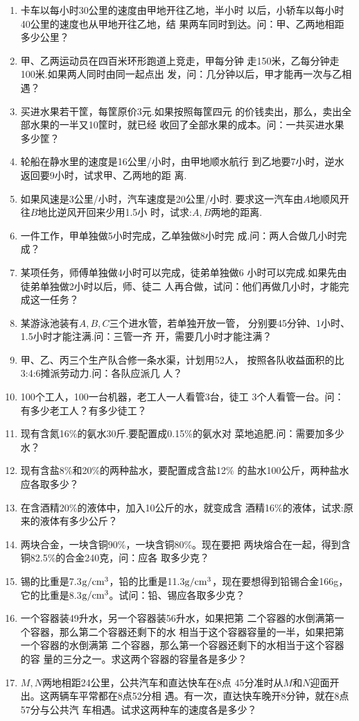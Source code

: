 \begin{enumerate}
\item  卡车以每小时30公里的速度由甲地开往乙地，半小时
以后，小轿车以每小时40公里的速度也从甲地开往乙地，结
果两车同时到达。问：甲、乙两地相距多少公里？
\item  甲、乙两运动员在四百米环形跑道上竞走，甲每分钟
走150米，乙每分钟走100米.如果两人同时由同一起点出
发，问：几分钟以后，甲才能再一次与乙相遇？
\item  买进水果若干筐，每筐原价3元.如果按照每筐四元
的价钱卖出，那么，卖出全部水果的一半又10筐时，就已经
收回了全部水果的成本。问：一共买进水果多少筐？
\item  轮船在静水里的速度是16公里/小时，由甲地顺水航行
到乙地要7小时，逆水返回要9小时，试求甲、乙两地的距
离.
\item  如果风速是3公里/小时，汽车速度是20公里/小时.
要求这一汽车由$A$地顺风开往$B$地比逆风开回来少用1.5小
时，试求:$A,B$两地的距离.
\item  一件工作，甲单独做5小时完成，乙单独做8小时完
成.问：两人合做几小时完成？
\item  某项任务，师傅单独做4小时可以完成，徒弟单独做6
小时可以完成.如果先由徒弟单独做2小时以后，师、徒二
人再合做，试问：他们再做几小时，才能完成这一任务？
\item  某游泳池装有$A, B, C$三个进水管，若单独开放一管，
分别要45分钟、1小时、1.5小时才能注满.问：三管一齐
开，需要几小时才能注满？
\item  甲、乙、丙三个生产队合修一条水渠，计划用52人，
按照各队收益面积的比3:4:6摊派劳动力.问：各队应派几
人？
\item  100个工人，100一台机器，老工人一人看管3台，徒工
3个人看管一台。问：有多少老工人？有多少徒工？
\item  现有含氮16\%的氨水30斤.要配置成0.15\%的氨水对
菜地追肥.问：需要加多少水？
\item  现有含盐8\%和20\%的两种盐水，要配置成含盐12\%
的盐水100公斤，两种盐水应各取多少？

\item  在含酒精20\%的液体中，加入10公斤的水，就变成含
酒精16\%的液体，试求:原来的液体有多少公斤？
\item  两块合金，一块含铜90\%，一块含铜80\%。现在要把
两块熔合在一起，得到含铜82.5\%的合金240克，问：应各
取多少克？

\item 锡的比重是7.3${\rm g}/{\rm cm}^3$，铅的比重是11.3${\rm g}/{\rm cm}^3$，现在要想得到铅锡合金166g，它的比重是8.3${\rm g}/{\rm cm}^3$。试问：铅、锡应各取多少克？

\item 一个容器装49升水，另一个容器装56升水，如果把第
二个容器的水倒满第一个容器，那么第二个容器还剩下的水
相当于这个容器容量的一半，如果把第一个容器的水倒满第
二个容器，那么第一个容器还剩下的水相当于这个容器的容
量的三分之一。求这两个容器的容量各是多少？
\item $M, N$两地相距24公里，公共汽车和直达快车在8点
45分准时从$M$和$N$迎面开出。这两辆车平常都在8点52分相
遇。有一次，直达快车晚开8分钟，就在8点57分与公共汽
车相遇。试求这两种车的速度各是多少？

\end{enumerate}

